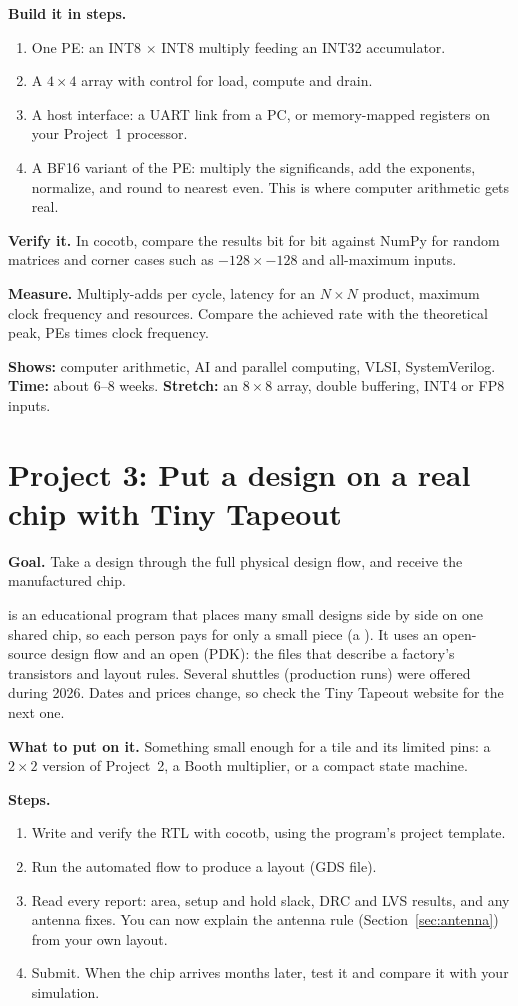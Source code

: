 \textbf{Build it in steps.}
\begin{enumerate}
  \item One PE: an INT8 $\times$ INT8 multiply feeding an INT32 accumulator.
  \item A $4 \times 4$ array with control for load, compute and drain.
  \item A host interface: a UART link from a PC, or memory-mapped registers on your Project~1 processor.
  \item A BF16 variant of the PE: multiply the significands, add the exponents, normalize, and round to nearest even. This is where computer arithmetic gets real.
\end{enumerate}

\textbf{Verify it.} In cocotb, compare the results bit for bit against NumPy for random matrices and corner cases such as $-128 \times -128$ and all-maximum inputs.

\textbf{Measure.} Multiply-adds per cycle, latency for an $N \times N$ product, maximum clock frequency and resources. Compare the achieved rate with the theoretical peak, PEs times clock frequency.

\textbf{Shows:} computer arithmetic, AI and parallel computing, VLSI, SystemVerilog. \textbf{Time:} about 6--8 weeks. \textbf{Stretch:} an $8 \times 8$ array, double buffering, INT4 or FP8 inputs.

\section{Project 3: Put a design on a real chip with Tiny Tapeout}

\textbf{Goal.} Take a design through the full physical design flow, and receive the manufactured chip.

 is an educational program that places many small designs side by side on one shared chip, so each person pays for only a small piece (a ). It uses an open-source design flow and an open  (PDK): the files that describe a factory's transistors and layout rules. Several shuttles (production runs) were offered during 2026. Dates and prices change, so check the Tiny Tapeout website for the next one.

\textbf{What to put on it.} Something small enough for a tile and its limited pins: a $2 \times 2$ version of Project~2, a Booth multiplier, or a compact state machine.

\textbf{Steps.}
\begin{enumerate}
  \item Write and verify the RTL with cocotb, using the program's project template.
  \item Run the automated flow to produce a layout (GDS file).
  \item Read every report: area, setup and hold slack, DRC and LVS results, and any antenna fixes. You can now explain the antenna rule (Section~\ref{sec:antenna}) from your own layout.
  \item Submit. When the chip arrives months later, test it and compare it with your simulation.
\end{enumerate}

